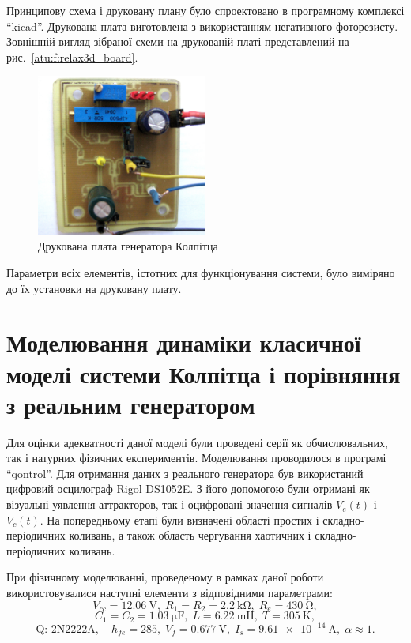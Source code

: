 Принципову схема і друковану плану було спроектовано в
програмному комплексі ``kicad''. Друкована плата виготовлена
з використанням негативного фоторезисту. Зовнішній
вигляд зібраної схеми на друкованій платі представлений
на рис.~\ref{atu:f:relax3d_board}.

\begin{figure}[htb!]
\centerline{\includegraphics[width=0.5\textwidth]{p/colp_board.jpg} }
\caption{Друкована плата генератора Колпітца}
\label{atu:f:colp_board}
\end{figure}

Параметри всіх елементів, істотних для функціонування системи,
було виміряно до їх установки на друковану плату.



\section{Моделювання динаміки класичної моделі системи Колпітца і порівняння з реальним генератором}%

Для оцінки адекватності даної моделі були проведені
серії як обчислювальних, так і натурних фізичних
експериментів.
Моделювання проводилося в програмі ``qontrol''.
Для отримання даних з реального генератора був використаний
цифровий осцилограф Rigol DS1052E. З його допомогою були отримані
як візуальні уявлення аттракторов, так і оцифровані значення
сигналів
$ V_e (t) $ і
$ V_c (t) $. На попередньому етапі були визначені області простих
і складно-періодичних коливань, а також область чергування
хаотичних і складно-періодичних коливань.

При фізичному моделюванні, проведеному в рамках даної
роботи використовувалися наступні елементи з відповідними
параметрами:
%
\[
  V_{cc} = \SI{12.06}{\volt},          \;
  R_1 = R_2 = \SI{2.2}{\kilo\ohm},     \;
  R_e = \SI{430}{\ohm},
\]
%
\[
  C_1 = C_2 = \SI{1.03}{\micro\farad}, \;
  L = \SI{6.22}{\milli\henry},         \;
  T = \SI{305}{\kelvin},
\]
%
\[
  \text{Q: 2N2222A}, \quad
  h_{fe}=285, \;
  V_f = \SI{0.677}{\volt}, \;
  I_s = \SI{9.61e-14}{\ampere}, \;
  \alpha \approx 1.
\]

